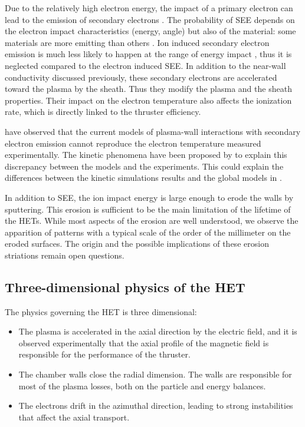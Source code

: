   Due to the relatively high electron energy, the impact of a primary electron can lead to the emission of secondary electrons \citep{barral2003a,villemant2018}.
  The probability of \ac{SEE} depends on the electron impact characteristics (energy, angle) but also of the material\string: some materials are more emitting than others \citep{gascon2003}.
  Ion induced secondary electron emission is much less likely to happen at the range of energy impact \citep{ohya2004}, thus it is neglected compared to the electron induced \ac{SEE}.
  In addition to the near-wall conductivity discussed previously, these secondary electrons are accelerated toward the plasma by the sheath.
  Thus they modify the plasma and the sheath properties.
  Their impact on the electron temperature also affects the ionization rate, which is directly linked to the thruster efficiency.
  
  
  \citet{raitses2005} have observed that the current models of plasma-wall interactions with secondary electron emission cannot reproduce the electron temperature measured experimentally.
  The kinetic phenomena have been proposed by \citet{sydorenko2007} to explain this discrepancy between the models and the experiments.
  This could explain the differences between the kinetic simulations results and the global models in \citet{croes2017}.   
    
  \vspace{1em}
  In addition to \ac{SEE}, the ion impact energy is large enough to erode the walls by sputtering.
  This erosion is sufficient to be the main limitation of the lifetime of the \ac{HET}s.
  While most aspects of the erosion are well understood, we observe the apparition of  patterns with a typical scale of the order of the millimeter on the eroded surfaces.
  The origin and the possible implications of these erosion striations remain open questions.
  

\subsection*{Three-dimensional physics of the HET}
\label{sec-3Dphi}

The physics governing the \ac{HET} is three dimensional\string:
\begin{itemize}
  \item The plasma is accelerated in the axial direction by the electric field, and it is observed experimentally that the axial profile of the magnetic field is responsible for the performance of the thruster.
  \item The chamber walls close the radial dimension. The walls are responsible for most of the plasma losses, both on the particle and energy balances.
  \item The electrons drift in the azimuthal direction, leading to strong instabilities that affect the axial transport.
\end{itemize}


